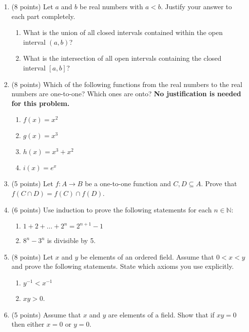 \documentclass[10pt]{article}
\newcommand{\N}{\mathbb{N}}
\begin{document}
\begin{enumerate}

\item (8 points) Let $a$ and $b$ be real numbers with $a<b$. Justify your answer to each part completely. 
\begin{enumerate}
\item What is the union of all closed intervals contained within the open interval $(a,b)$? 
\item What is the intersection of all open intervals containing the closed interval $[a,b]$? 
\end{enumerate}

\item (8 points) Which of the following functions from the real numbers to the real numbers are one-to-one? Which ones are onto? \textbf{No justification is needed for this problem.}
\begin{enumerate}
\item $f(x) = x^2$  
\item $g(x) = x^3$ 
\item $h(x) = x^3+x^2$
\item $i(x) = e^x$
\end{enumerate}

\item (5 points) Let $f\colon A \to B$ be a one-to-one function and $C,D\subseteq A$. Prove that $f(C\cap D) = f(C)\cap f(D)$.

\item (6 points)  Use induction to prove the following statements for each $n\in \N$: 
\begin{enumerate}
 \item $1+2+\ldots +2^n=2^{n+1}-1$
 \item $8^n-3^n$ is divisible by 5.
\end{enumerate}

\item (8 points) Let $x$ and $y$ be elements of an ordered field. Assume that $0<x<y$ and prove the following statements. State which axioms you use explicitly. 
\begin{enumerate}
\item $y^{-1} < x^{-1}$
\item $xy>0$. 
\end{enumerate}

\item (5 points) Assume that $x$ and $y$ are elements of a field. Show that if $xy=0$ then either $x=0$ or $y=0$. 
\end{enumerate}
\end{document}
